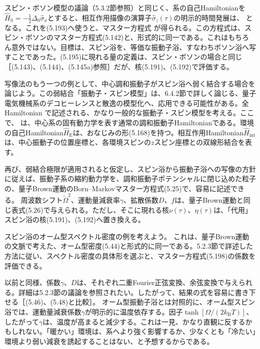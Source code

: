 スピン・ボソン模型の議論（5.3.2節参照）と同じく、系の自己Hamiltonianを$\hat H_{\mathrm S}=-\frac12\Delta_0\hat\sigma_x$とすると、相互作用描像の演算子$\hat\sigma_z(\tau)$の明示的時間発展は、
となる。これを(5.193)へ使うと、マスター方程式
が得られる。この方程式は、スピン・ボソンのマスター方程式(5.142)と、形式的に同一である。これはもちろん意外ではない。目標は、スピン浴を、等価な振動子浴、すなわちボソン浴へ写すことであった。(5.195)に現れる量の定義は、スピン・ボソンの場合と同じ［(5.143)、(5.144)、(5.145a)参照］だが、核(5.191)、(5.192)で評価する。

写像法のもう一つの例として、中心調和振動子がスピン浴へ弱く結合する場合\cite{ref242}を論じよう。この弱結合「振動子・スピン模型」は、6.4.2節で詳しく論じる、量子電気機械系のデコヒーレンスと散逸の模型化へ、応用できる可能性がある。全Hamiltonian
で記述される、かなり一般的な振動子・スピン模型を考える。ここで、
\hypertarget{srcpage:235}{}\label{srcpage:235}
は、中心系の固有動力学を表す通常の調和振動子Hamiltonianである。環境の自己Hamiltonian$\hat H_{\mathrm E}$は、おなじみの形(5.168)を持つ。相互作用Hamiltonian$\hat H_{\mathrm{int}}$は、中心振動子の位置座標と、各環境スピンの$z$スピン座標との双線形結合を表す。

再び、弱結合極限が適用されると仮定し、スピン浴から振動子浴への写像の方針に従えば、振動子系の縮約動力学を、調和振動子ポテンシャルに閉じ込めた粒子の、量子Brown運動のBorn--Markovマスター方程式(5.25)で、容易に記述できる。
周波数シフト$\widetilde\Omega^2$、運動量減衰率$\gamma$、拡散係数$D$、$f$は、量子Brown運動と同じ表式(5.26)で与えられる。ただし、そこに現れる核$\nu(\tau)$、$\eta(\tau)$は、「代用」スピン浴の核(5.191)、(5.192)へ置き換える。

スピン浴のオーム型スペクトル密度の例を考えよう。
これは、量子Brown運動の文脈で考えた、オーム型密度(5.44)と形式的に同一である。5.2.3節で詳述した方法に従い、スペクトル密度の具体形を選ぶと、マスター方程式(5.198)の係数を評価できる。

以前と同様、係数$\gamma$、$D$は、それぞれ二重Fourier正弦変換、余弦変換で与えられる。詳細は5.2.3節の議論を参照されたい。したがって、結果の式を容易に書き下せる［(5.46)、(5.48)と比較］。
オーム型振動子浴とは対照的に、オーム型スピン浴では、運動量減衰係数$\gamma$が明示的に温度依存する。因子$\tanh[\Omega/(2k_{\mathrm B}T)]$、したがって$\gamma$は、温度が高まると減少する。これは一見、かなり直観に反するかもしれない。「暖かい」環境は、系へより強く影響するか、少なくとも「冷たい」環境より弱い減衰を誘起することはない、と予想するからである。
\hypertarget{srcpage:236}{}\label{srcpage:236}

